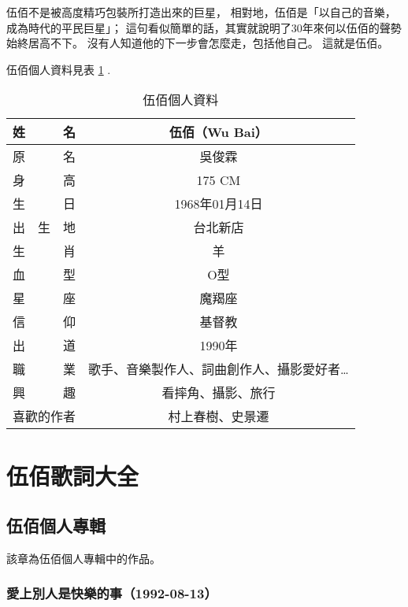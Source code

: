 \documentclass[UTF8,a4paper,oneside,twocolumn,12pt]{ctexbook}
\begin{document}
伍佰不是被高度精巧包裝所打造出來的巨星，
相對地，伍佰是「以自己的音樂，成為時代的平民巨星」；
這句看似簡單的話，其實就說明了30年來何以伍佰的聲勢始終居高不下。
沒有人知道他的下一步會怎麼走，包括他自己。
這就是伍佰。

伍佰個人資料見表 \ref{tab:gerenziliao} .

\begin{table}[htbp]
	\caption{伍佰個人資料} \label{tab:gerenziliao}
	\centering
	\begin{tabular}{|c|c|}
		\hline
		姓　　　名 & 伍佰（Wu Bai） \\
		\hline
		原　　　名 & 吳俊霖 \\
		\hline
		身　　　高 & 175 CM \\
		\hline
		生　　　日 & 1968年01月14日 \\
		\hline
		出　生　地 & 台北新店 \\
		\hline
		生　　　肖 & 羊 \\
		\hline
		血　　　型 & O型 \\
		\hline
		星　　　座 & 魔羯座 \\
		\hline
		信　　　仰 & 基督教 \\
		\hline
		出　　　道 & 1990年 \\
		\hline
		職　　　業 & 歌手、音樂製作人、詞曲創作人、攝影愛好者… \\
		\hline
		興　　　趣 & 看摔角、攝影、旅行 \\
		\hline
		喜歡的作者 & 村上春樹、史景遷 \\
		\hline
	\end{tabular}
\end{table}

\tableofcontents

\mainmatter

\twocolumn
\part{伍佰歌詞大全}
\chapter{伍佰個人專輯}
該章為伍佰個人專輯中的作品。

\section*{愛上別人是快樂的事（1992-08-13）}
\end{document}
